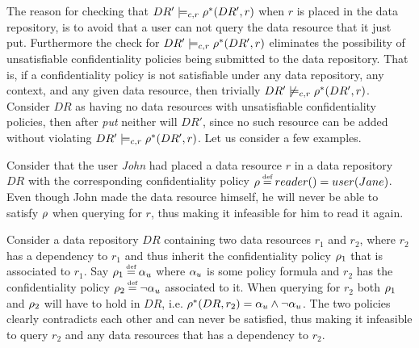 The reason for checking that $DR' \models_{c,r} \rho^{\ast}(DR',r)$ when $r$ is placed in the data repository, is to avoid that a user can not query the data resource that it just put. Furthermore the check for $DR' \models_{c,r} \rho^{\ast}(DR',r)$ eliminates the possibility of unsatisfiable confidentiality policies being submitted to the data repository. That is, if a confidentiality policy is not satisfiable under any data repository, any context, and any given data resource, then trivially $DR' \not\models_{c,r} \rho^{\ast}(DR',r)$. Consider $DR$ as having no data resources with unsatisfiable confidentiality policies, then after \emph{put} neither will $DR'$, since no such resource can be added without violating $DR' \models_{c,r} \rho^{\ast}(DR',r)$. Let us consider a few examples.

\begin{example}
Consider that the user \emph{John} had placed a data resource $r$ in a data repository $DR$ with the corresponding confidentiality policy $\conf \eqdef reader() = user(Jane)$. Even though John made the data resource himself, he will never be able to satisfy $\rho$ when querying for $r$, thus making it infeasible for him to read it again.
\end{example}

\begin{example}
Consider a data repository $DR$ containing two data resources $r_1$ and $r_2$, where $r_2$ has a dependency to $r_1$ and thus inherit the confidentiality policy $\rho_1$ that is associated to $r_1$. Say $\conf_1 \eqdef \upf$ where $\alpha_u$ is some policy formula and $r_2$ has the confidentiality policy $\conf_2 \eqdef \lnot \upf$ associated to it. When querying for $r_2$ both $\rho_1$ and $\rho_2$ will have to hold in $DR$, i.e. $\rho^{\ast}(DR,r_2) = \alpha_u \land \lnot \alpha_u$. The two policies clearly contradicts each other and can never be satisfied, thus making it infeasible to query $r_2$ and any data resources that has a dependency to $r_2$.
\end{example}

